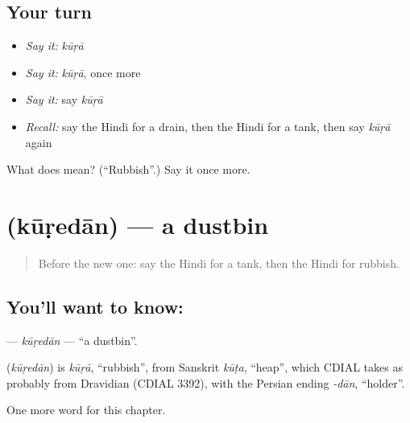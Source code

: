 \subsection*{Your turn}
\begin{itemize}
\raggedright
  \item \emph{Say it:} \emph{kūṛā}
  \item \emph{Say it:} \emph{kūṛā}, once more
  \item \emph{Say it:} say \emph{kūṛā}
  \item \emph{Recall:} say the Hindi for a drain, then the Hindi for a tank, then say \emph{kūṛā} again
\end{itemize}

\begin{tcolorbox}[breakable,colback=teal!4,colframe=teal!35!black,title={Before you move on}]
What does  mean? (\textquotedblleft{}Rubbish\textquotedblright{}.) Say it once more.
\end{tcolorbox}
\section[\texorpdfstring{\hi{कूड़ेदान} (kūṛedān)}{कूड़ेदान (kūṛedān)}]{ (kūṛedān) — a dustbin}

\label{lesson:HI-C268-kuredan}



\begin{quote}
Before the new one: say the Hindi for a tank, then the Hindi for rubbish.
\end{quote}

\subsection*{You'll want to know: }
\textbf{} — \emph{kūṛedān} — \textquotedblleft{}a dustbin\textquotedblright{}.

\begin{cousinweb}
\textbf{} (\emph{kūṛedān}) is \emph{kūṛā}, \textquotedblleft{}rubbish\textquotedblright{}, from Sanskrit \emph{kūṭa}, \textquotedblleft{}heap\textquotedblright{}, which CDIAL takes as probably from Dravidian (CDIAL 3392), with the Persian ending \emph{-dān}, \textquotedblleft{}holder\textquotedblright{}.
\end{cousinweb}

\begin{grammarlens}[title={What you've built}]
One more word for this chapter.
\end{grammarlens}

